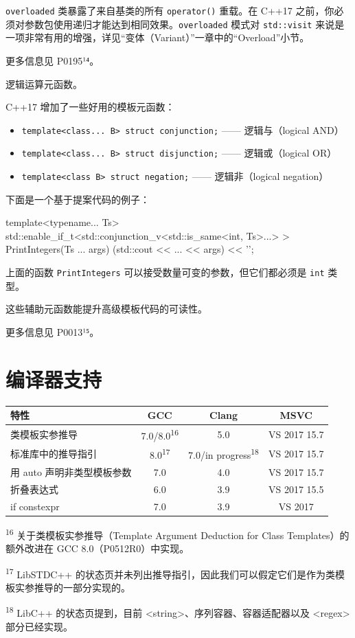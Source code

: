 \texttt{overloaded} 类暴露了来自基类的所有 \texttt{operator()} 重载。在 C++17 之前，你必须对参数包使用递归才能达到相同效果。\texttt{overloaded} 模式对 \texttt{std::visit} 来说是一项非常有用的增强，详见“变体（Variant）”一章中的“Overload”小节。

更多信息见 P0195¹⁴。

逻辑运算元函数。

C++17 增加了一些好用的模板元函数：

\begin{itemize}
\item \texttt{template<class... B> struct conjunction;} —— 逻辑与（logical AND）
\item \texttt{template<class... B> struct disjunction;} —— 逻辑或（logical OR）
\item \texttt{template<class B> struct negation;} —— 逻辑非（logical negation）
\end{itemize}

下面是一个基于提案代码的例子：

\begin{codebox}[cpp]
template<typename... Ts>
std::enable_if_t<std::conjunction_v<std::is_same<int, Ts>...> >
PrintIntegers(Ts ... args)
{
(std::cout << ... << args) << '\n';
}
\end{codebox}

上面的函数 \texttt{PrintIntegers} 可以接受数量可变的参数，但它们都必须是 \texttt{int} 类型。

这些辅助元函数能提升高级模板代码的可读性。

更多信息见 P0013¹⁵。

\section{编译器支持}

\begin{table}[H]
\centering
\begin{tabularx}{\textwidth}{X c c c}
\toprule
特性 & GCC & Clang & MSVC \\
\midrule
类模板实参推导 & 7.0/8.0\textsuperscript{16} & 5.0 & VS 2017 15.7 \\
标准库中的推导指引 & 8.0\textsuperscript{17} & 7.0/in progress\textsuperscript{18} & VS 2017 15.7 \\
用 auto 声明非类型模板参数 & 7.0 & 4.0 & VS 2017 15.7 \\
折叠表达式 & 6.0 & 3.9 & VS 2017 15.5 \\
if constexpr & 7.0 & 3.9 & VS 2017 \\
\bottomrule
\end{tabularx}
\end{table}

\par\smallskip
\noindent\textsuperscript{16} 关于类模板实参推导（Template Argument Deduction for Class Templates）的额外改进在 GCC 8.0（P0512R0）中实现。

\noindent\textsuperscript{17} LibSTDC++ 的状态页并未列出推导指引，因此我们可以假定它们是作为类模板实参推导的一部分实现的。

\noindent\textsuperscript{18} LibC++ 的状态页提到，目前 <string>、序列容器、容器适配器以及 <regex> 部分已经实现。
